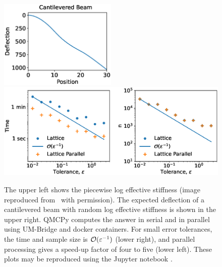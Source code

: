 \documentclass[graybox]{svmult}
\begin{document}
\begin{figure}[t]
    \centering
    \includegraphics[width=0.5\textwidth]{cantileveredbeamwords.eps}
    \includegraphics[width=1\textwidth]{ldparallelbeam.eps}
    \caption{The upper left shows the piecewise log effective stiffness (image reproduced from~\cite{ParSee22a} with permission). The expected deflection of a cantilevered beam with random log effective stiffness is shown in the upper right.  QMCPy computes the answer in serial and in parallel using UM-Bridge and docker containers.  For small error tolerances, the time and sample size is ${\mathcal{O}}(\varepsilon^{-1})$ (lower right), and parallel processing gives a speed-up factor of four to five (lower left). These plots may be reproduced using the Jupyter notebook \cite{MCQMC2022Figs}.  }
    \label{CDHJSfigbeam}
\end{figure}
\end{document}
